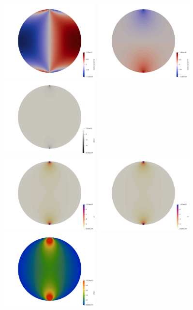 \newpage
\begin{center}
\includegraphics[width=5cm]{python_codes/fieldstone_58/results/111/u}
\includegraphics[width=5cm]{python_codes/fieldstone_58/results/111/v}
\includegraphics[width=5cm]{python_codes/fieldstone_58/results/111/divv}\\
\includegraphics[width=5cm]{python_codes/fieldstone_58/results/111/p}
\includegraphics[width=5cm]{python_codes/fieldstone_58/results/111/q}
\includegraphics[width=5cm]{python_codes/fieldstone_58/results/111/e}\\

\end{center}
